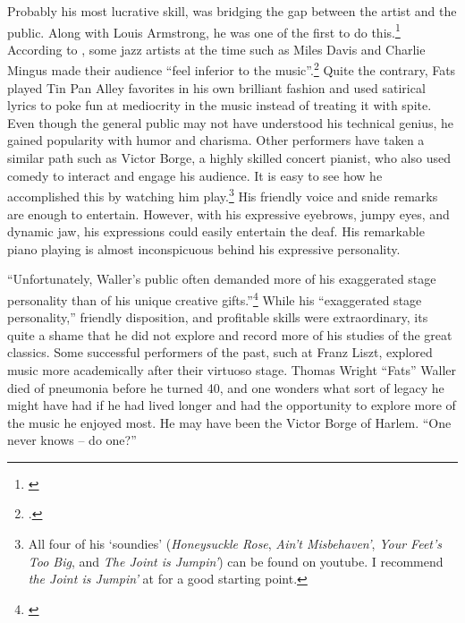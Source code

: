 \documentclass[11pt]{report}
\begin{document}
	\label{sec:charisma}
	Probably his most lucrative skill, was bridging the gap between the artist and the public. Along with Louis Armstrong, he was one of the first to do this.\footnote{\cite[3]{life}} According to \citeauthor{outside-insider}, some jazz artists at the time such as Miles Davis and Charlie Mingus made their audience ``feel inferior to the music''.\footnote{\cite[16]{outside-insider}.} Quite the contrary, Fats played Tin Pan Alley favorites in his own brilliant fashion and used satirical lyrics to poke fun at mediocrity in the music instead of treating it with spite. Even though the general public may not have understood his technical genius, he gained popularity with humor and charisma. Other performers have taken a similar path such as Victor Borge, a highly skilled concert pianist, who also used comedy to interact and engage his audience.
	It is easy to see how he accomplished this by watching him play.\footnote{All four of his `soundies' (\emph{Honeysuckle Rose}, \emph{Ain't Misbehaven'}, \emph{Your Feet's Too Big}, and \emph{The Joint is Jumpin'}) can be found on youtube. I recommend \emph{the Joint is Jumpin'} at  for a good starting point.} His friendly voice and snide remarks are enough to entertain. However, with his expressive eyebrows, jumpy eyes, and dynamic jaw, his expressions could easily entertain the deaf. His remarkable piano playing is almost inconspicuous behind his expressive personality.


	\label{sec:conclusion}

	``Unfortunately, Waller's public often demanded more of his exaggerated stage personality than of his unique creative gifts.''\footnote{\cite[40]{grove-book:waller}} While his ``exaggerated stage personality,'' friendly disposition, and profitable skills were extraordinary, its quite a shame that he did not explore and record more of his studies of the great classics. Some successful performers of the past, such at Franz Liszt, explored music more academically after their virtuoso stage. Thomas Wright ``Fats'' Waller died of pneumonia before he turned 40, and one wonders what sort of legacy he might have had if he had lived longer and had the opportunity to explore more of the music he enjoyed most. He may have been the Victor Borge of Harlem. ``One never knows -- do one?''




		\nocite{anecdotes}
		\nocite{experience}
		\nocite{grove-book:waller}
		\nocite{jazz_scene}
		\nocite{life}
		\nocite{modernism}
		\nocite{outside-insider}
		\nocite{transcriptions}
		\nocite{visions}
		\nocite{web:machlin}
		\nocite{web:stride}
		\nocite{youtube-joint_is_jumpin}
			\printbibliography
\end{document}
